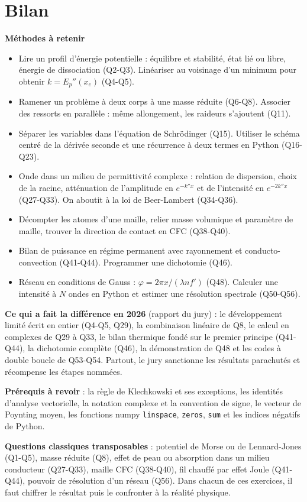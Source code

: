 \documentclass[11pt,a4paper]{article}
\providecommand{\tightlist}{\setlength{\itemsep}{0pt}\setlength{\parskip}{0pt}}
\begin{document}
\hypertarget{bilan}{%
\section{Bilan}\label{bilan}}

\textbf{Méthodes à retenir}

\begin{itemize}
\tightlist
\item
  Lire un profil d'énergie potentielle : équilibre et stabilité, état lié ou libre, énergie de dissociation (Q2-Q3). Linéariser au voisinage d'un minimum pour obtenir \(k=E_p''(x_e)\) (Q4-Q5).
\item
  Ramener un problème à deux corps à une masse réduite (Q6-Q8). Associer des ressorts en parallèle : même allongement, les raideurs s'ajoutent (Q11).
\item
  Séparer les variables dans l'équation de Schrödinger (Q15). Utiliser le schéma centré de la dérivée seconde et une récurrence à deux termes en Python (Q16-Q23).
\item
  Onde dans un milieu de permittivité complexe : relation de dispersion, choix de la racine, atténuation de l'amplitude en \(e^{-k''x}\) et de l'intensité en \(e^{-2k''x}\) (Q27-Q33). On aboutit à la loi de Beer-Lambert (Q34-Q36).
\item
  Décompter les atomes d'une maille, relier masse volumique et paramètre de maille, trouver la direction de contact en CFC (Q38-Q40).
\item
  Bilan de puissance en régime permanent avec rayonnement et conducto-convection (Q41-Q44). Programmer une dichotomie (Q46).
\item
  Réseau en conditions de Gauss : \(\varphi=2\pi x/(\lambda nf')\) (Q48). Calculer une intensité à \(N\) ondes en Python et estimer une résolution spectrale (Q50-Q56).
\end{itemize}

\textbf{Ce qui a fait la différence en 2026} (rapport du jury) : le développement limité écrit en entier (Q4-Q5, Q29), la combinaison linéaire de Q8, le calcul en complexes de Q29 à Q33, le bilan thermique fondé sur le premier principe (Q41-Q44), la dichotomie complète (Q46), la démonstration de Q48 et les codes à double boucle de Q53-Q54. Partout, le jury sanctionne les résultats parachutés et récompense les étapes nommées.

\textbf{Prérequis à revoir} : la règle de Klechkowski et ses exceptions, les identités d'analyse vectorielle, la notation complexe et la convention de signe, le vecteur de Poynting moyen, les fonctions numpy \texttt{linspace}, \texttt{zeros}, \texttt{sum} et les indices négatifs de Python.

\textbf{Questions classiques transposables} : potentiel de Morse ou de Lennard-Jones (Q1-Q5), masse réduite (Q8), effet de peau ou absorption dans un milieu conducteur (Q27-Q33), maille CFC (Q38-Q40), fil chauffé par effet Joule (Q41-Q44), pouvoir de résolution d'un réseau (Q56). Dans chacun de ces exercices, il faut chiffrer le résultat puis le confronter à la réalité physique.
\end{document}
